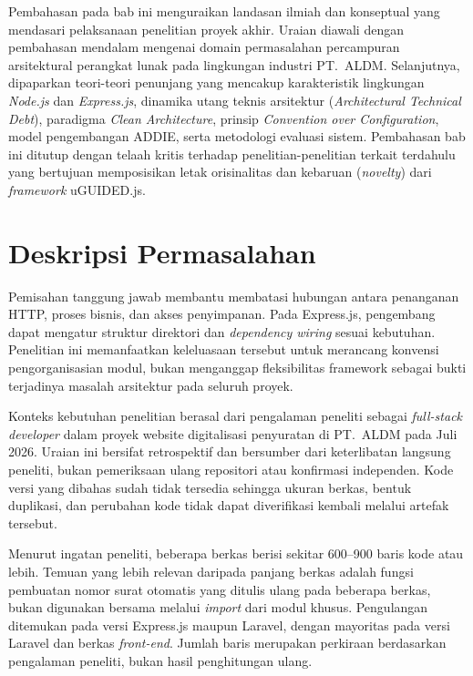 \documentclass[12pt,a4paper,oneside]{report}
\begin{document}
Pembahasan pada bab ini menguraikan landasan ilmiah dan konseptual yang mendasari pelaksanaan penelitian proyek akhir. Uraian diawali dengan pembahasan mendalam mengenai domain permasalahan percampuran arsitektural perangkat lunak pada lingkungan industri PT.\ ALDM. Selanjutnya, dipaparkan teori-teori penunjang yang mencakup karakteristik lingkungan \textit{Node.js} dan \textit{Express.js}, dinamika utang teknis arsitektur (\textit{Architectural Technical Debt}), paradigma \textit{Clean Architecture}, prinsip \textit{Convention over Configuration}, model pengembangan ADDIE, serta metodologi evaluasi sistem. Pembahasan bab ini ditutup dengan telaah kritis terhadap penelitian-penelitian terkait terdahulu yang bertujuan memposisikan letak orisinalitas dan kebaruan (\textit{novelty}) dari \textit{framework} uGUIDED.js.

\section{Deskripsi Permasalahan}
\label{sec:deskripsi_permasalahan}

Pemisahan tanggung jawab membantu membatasi hubungan antara penanganan HTTP, proses bisnis, dan akses penyimpanan. Pada Express.js, pengembang dapat mengatur struktur direktori dan \textit{dependency wiring} sesuai kebutuhan. Penelitian ini memanfaatkan keleluasaan tersebut untuk merancang konvensi pengorganisasian modul, bukan menganggap fleksibilitas framework sebagai bukti terjadinya masalah arsitektur pada seluruh proyek.

Konteks kebutuhan penelitian berasal dari pengalaman peneliti sebagai \textit{full-stack developer} dalam proyek website digitalisasi penyuratan di PT.\ ALDM pada Juli 2026. Uraian ini bersifat retrospektif dan bersumber dari keterlibatan langsung peneliti, bukan pemeriksaan ulang repositori atau konfirmasi independen. Kode versi yang dibahas sudah tidak tersedia sehingga ukuran berkas, bentuk duplikasi, dan perubahan kode tidak dapat diverifikasi kembali melalui artefak tersebut.

Menurut ingatan peneliti, beberapa berkas berisi sekitar 600--900 baris kode atau lebih. Temuan yang lebih relevan daripada panjang berkas adalah fungsi pembuatan nomor surat otomatis yang ditulis ulang pada beberapa berkas, bukan digunakan bersama melalui \textit{import} dari modul khusus. Pengulangan ditemukan pada versi Express.js maupun Laravel, dengan mayoritas pada versi Laravel dan berkas \textit{front-end}. Jumlah baris merupakan perkiraan berdasarkan pengalaman peneliti, bukan hasil penghitungan ulang.
\end{document}
